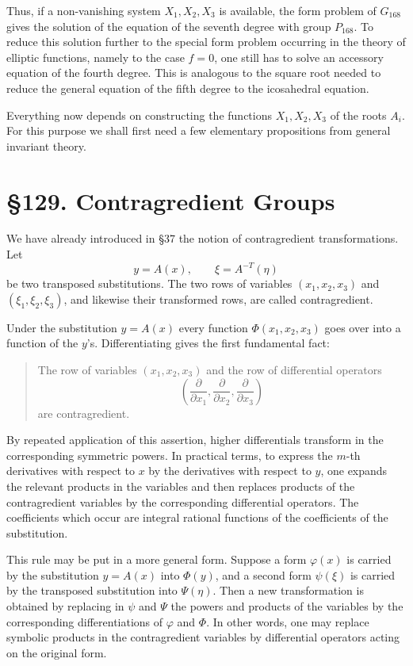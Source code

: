 \documentclass[12pt,a4paper]{article}
\newcommand{\webersection}[2]{\clearpage\section*{\S #1. #2}}
\begin{document}
Thus, if a non-vanishing system \(X_1,X_2,X_3\) is available, the form problem of \(G_{168}\) gives the solution of the equation of the seventh degree with group \(P_{168}\).  To reduce this solution further to the special form problem occurring in the theory of elliptic functions, namely to the case \(f=0\), one still has to solve an accessory equation of the fourth degree.  This is analogous to the square root needed to reduce the general equation of the fifth degree to the icosahedral equation.

Everything now depends on constructing the functions \(X_1,X_2,X_3\) of the roots \(A_i\).  For this purpose we shall first need a few elementary propositions from general invariant theory.

\webersection{129}{Contragredient Groups}

We have already introduced in \S 37 the notion of contragredient transformations.  Let
\[
 y=A(x),
\qquad \xi=A^{-T}(\eta)
\]
be two transposed substitutions.  The two rows of variables \((x_1,x_2,x_3)\) and \((\xi_1,\xi_2,\xi_3)\), and likewise their transformed rows, are called contragredient.

Under the substitution \(y=A(x)\) every function \(\Phi(x_1,x_2,x_3)\) goes over into a function of the \(y\)'s.  Differentiating gives the first fundamental fact:
\begin{quote}
The row of variables \((x_1,x_2,x_3)\) and the row of differential operators
\[
 \left(\frac{\partial}{\partial x_1},\frac{\partial}{\partial x_2},\frac{\partial}{\partial x_3}\right)
\]
are contragredient.
\end{quote}

By repeated application of this assertion, higher differentials transform in the corresponding symmetric powers.  In practical terms, to express the \(m\)-th derivatives with respect to \(x\) by the derivatives with respect to \(y\), one expands the relevant products in the variables and then replaces products of the contragredient variables by the corresponding differential operators.  The coefficients which occur are integral rational functions of the coefficients of the substitution.

This rule may be put in a more general form.  Suppose a form \(\varphi(x)\) is carried by the substitution \(y=A(x)\) into \(\Phi(y)\), and a second form \(\psi(\xi)\) is carried by the transposed substitution into \(\Psi(\eta)\).  Then a new transformation is obtained by replacing in \(\psi\) and \(\Psi\) the powers and products of the variables by the corresponding differentiations of \(\varphi\) and \(\Phi\).  In other words, one may replace symbolic products in the contragredient variables by differential operators acting on the original form.
\end{document}
